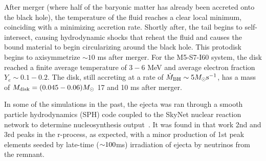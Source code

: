 After merger (where half of the baryonic matter has already been accreted onto the black hole), the temperature of the fluid reaches a clear local minimum, coinciding with a minimizing accretion rate.  Shortly after, the tail begins to self-intersect, causing hydrodynamic shocks that reheat the fluid and causes the bound material to begin circularizing around the black hole.  
This protodisk begins to axisymmetrize $\sim 10$ ms after merger.  
For the M5-S7-I60 system, the disk reached a finite average temperature of $3 - 6$ MeV and average electron fraction $Y_e \sim 0.1 - 0.2$.  The disk, still accreting at a rate of $\dot{M}_{\rm BH} \sim 5 M_\odot {\rm s}^{-1}$, has a mass of $M_{\rm disk} = (0.045 - 0.06) M_\odot$ 17 and 10 ms after merger.

In some of the \SpEC simulations in the past, the ejecta was ran through a smooth particle hydrodynamics (SPH) code coupled to the SkyNet nuclear reaction network to determine nucleosynthesis output~\cite{Lippuner2015,Roberts:2016}.
It was found in that work 2nd and 3rd peaks in the r-process, as expected, with a minor production of 1st peak elements seeded by late-time ($\mathord{\sim}100$ms) irradiation of ejecta by neutrinos from the remnant. 